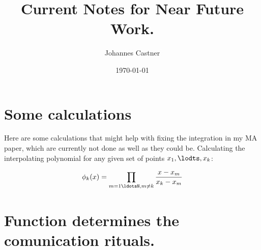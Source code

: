 \documentclass[11pt]{article}
\title{Current Notes for Near Future Work.}
\author{Johannes Castner}
\date{\today}
\begin{document}
\maketitle

\setcounter{tocdepth}{3}
\tableofcontents
\vspace*{1cm}


\newpage

\section{Some calculations}
\label{sec-1}

Here are some calculations that might help with fixing the integration in my MA paper, which are currently not done as well as they could be. Calculating the interpolating polynomial for any given set of points $x_1, \lodts, x_k$:

$$\phi_k(x)=\prod_{m=1\ldotsN, m\not=k}\frac{x-x_m}{x_k-x_m}$$
\section{Function determines the comunication rituals.}
\label{sec-2}
\end{document}
